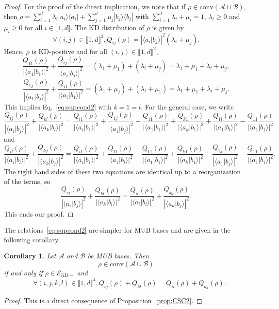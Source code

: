 \documentclass[a4paper, notitlepage, 11pt]{article}
\numberwithin{equation}{section}
\newcommand{\bra}[1]{\langle #1|}
\newcommand{\cket}[1]{|#1\rangle}
\newcommand{\bracket}[2]{\langle #1|#2\rangle}
\newcommand{\mcl}[1]{\mathcal{#1}}
\newcommand{\Acal}{{\mathcal A}}
\newcommand{\Bcal}{{\mathcal B}}
\newcommand{\EcalKDC}{{\mathcal E}_{\mathrm{KD+}}}
\newcommand{\conv}[1]{\mathrm{conv}\left(#1\right)}
\newcommand{\IntEnt}[2]{\llbracket #1 , #2 \rrbracket}
\newcommand{\convAB}{\conv{\Acal \cup \Bcal}}
\newtheorem{Cor}[Theorem]{Corollary}
\begin{document}
\begin{proof}
For the proof of the direct implication, we note that if $\rho\in\convAB$, then $\rho=\sum_{i=1}^{d}\lambda_{i}\cket{a_i}\bra{a_i} + \sum_{j=1}^{d}\mu_{j}\cket{b_j}\bra{b_j}$ with $\sum_{i=1}^{d} \lambda_{i}+\mu_{i} = 1$, $\lambda_{i}\geqslant 0$ and $\mu_{i}\geqslant 0$ for all $i\in\IntEnt{1}{d}$. The KD distribution of $\rho$ is given by
\[
\forall (i,j)\in\IntEnt{1}{d}^2, Q_{ij}(\rho) = \left|\bracket{a_i}{b_j}\right|^2\left(\lambda_{i}+\mu_{j}\right).
\]
Hence, $\rho$ is KD-positive and  for all $ (i,j)\in\IntEnt{1}{d}^2$, 
\[
\frac{Q_{11}(\rho)}{\left|\bracket{a_1}{b_1}\right|^2} + \frac{Q_{ij}(\rho)}{\left|\bracket{a_i}{b_j}\right|^2} = \left(\lambda_{1}+\mu_{1}\right) +\left(\lambda_{i}+\mu_{j}\right) = \lambda_{1}+\mu_{1} + \lambda_{i}+\mu_{j} ,
\] 
\[
\frac{Q_{1j}(\rho)}{\left|\bracket{a_1}{b_j}\right|^2} + \frac{Q_{i1}(\rho)}{\left|\bracket{a_i}{b_1}\right|^2} = \left(\lambda_{1}+\mu_{j}\right) +\left(\lambda_{i}+\mu_{1}\right) = \lambda_{1}+\mu_{1} + \lambda_{i}+\mu_{j} .
\]
This implies Eq.~\eqref{eq:supcond2} with $k=1=l$. For the general case,
we write
\[
\frac{Q_{ij}(\rho)}{\left|\bracket{a_i}{b_j}\right|^2} + \frac{Q_{kl}(\rho)}{\left|\bracket{a_k}{b_l}\right|^2} =  \frac{Q_{i1}(\rho)}{\left|\bracket{a_i}{b_1}\right|^2} +\frac{Q_{1j}(\rho)}{\left|\bracket{a_1}{b_j}\right|^2} -  \frac{Q_{11}(\rho)}{\left|\bracket{a_1}{b_1}\right|^2} +\frac{Q_{k1}(\rho)}{\left|\bracket{a_k}{b_1}\right|^2} +\frac{Q_{1l}(\rho)}{\left|\bracket{a_1}{b_l}\right|^2} -  \frac{Q_{11}(\rho)}{\left|\bracket{a_1}{b_1}\right|^2}
\]
and
\[
\frac{Q_{il}(\rho)}{\left|\bracket{a_i}{b_l}\right|^2} + \frac{Q_{kj}(\rho)}{\left|\bracket{a_k}{b_j}\right|^2} =  \frac{Q_{i1}(\rho)}{\left|\bracket{a_i}{b_1}\right|^2} +\frac{Q_{1l}(\rho)}{\left|\bracket{a_1}{b_l}\right|^2} -  \frac{Q_{11}(\rho)}{\left|\bracket{a_1}{b_1}\right|^2} +\frac{Q_{k1}(\rho)}{\left|\bracket{a_k}{b_1}\right|^2} +\frac{Q_{1j}(\rho)}{\left|\bracket{a_1}{b_j}\right|^2} -  \frac{Q_{11}(\rho)}{\left|\bracket{a_1}{b_1}\right|^2}.
\]
The right hand sides of these two equations are identical up to a reorganization of the terms, so
\[
\frac{Q_{ij}(\rho)}{\left|\bracket{a_i}{b_j}\right|^2} + \frac{Q_{kl}(\rho)}{\left|\bracket{a_k}{b_l}\right|^2} = \frac{Q_{il}(\rho)}{\left|\bracket{a_i}{b_l}\right|^2} + \frac{Q_{kj}(\rho)}{\left|\bracket{a_k}{b_j}\right|^2}.
\]
This ends {our} proof.
\end{proof}

The relations~\eqref{eq:supcond2} are simpler for MUB bases and are given in the following corollary. 
\begin{Cor}\label{cor:CSC1}
Let $\mcl{A}$ and $\mcl{B}$ be MUB bases.
Then
$$
\rho\in \convAB
$$ 
if and only if $\rho\in\EcalKDC$ and 
\begin{equation}\label{eq:supcond4}
\quad \forall (i,j,k,l)\in\IntEnt{1}{d}^4, Q_{ij}(\rho) +Q_{kl}(\rho) = Q_{il}(\rho) +Q_{kj}(\rho).
\end{equation}
\end{Cor}
\begin{proof}
This is a direct consequence of Proposition~\ref{prop:CSC2}. 
\end{proof}
\end{document}
